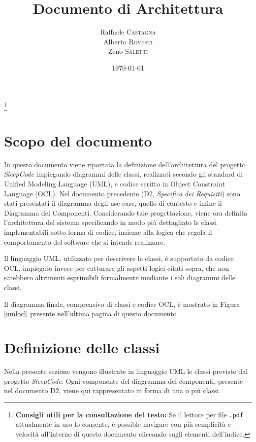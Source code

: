 \documentclass[11pt, a4paper]{article}
\title{Documento di Architettura}
\author{Raffaele \textsc{Castagna}\\
Alberto \textsc{Rovesti}\\
Zeno \textsc{Saletti}}
\date{\today}
\theoremstyle{definition} %
\newcommand\blfootnote[1]{%
  \begingroup
  \renewcommand\thefootnote{}\footnote{#1}%
  \addtocounter{footnote}{-1}%
  \endgroup
}
\begin{document}


\tableofcontents\blfootnote{\textbf{Consigli utili per la consultazione del testo:} Se il lettore per file \texttt{.pdf} attualmente in uso lo consente, è possible navigare con più semplicità e velocità all'interno di questo documento cliccando sugli elementi dell'indice.}

\newpage

\section*{Scopo del documento}
In questo documento viene riportata la definizione dell'architettura del
progetto \textit{SleepCode} impiegando diagrammi delle classi, realizzati
secondo gli standard di Unified Modeling Language (UML), e codice scritto in Object
Constraint Language (OCL). Nel documento precedente (D2, \textit{Specifica
dei Requisiti}) sono stati presentati il diagramma degli use case, quello
di contesto e infine il Diagramma dei Componenti. Considerando tale
progettazione, viene ora definita l'architettura del sistema specificando
in modo più dettagliato le classi implementabili sotto forma di
codice, insieme alla logica che regola il comportamento del software che
si intende realizzare.

Il linguaggio UML, utilizzato per descrivere le classi, è supportato da
codice OCL, impiegato invece per catturare gli aspetti logici citati sopra,
che non sarebbero altrimenti esprimibili formalmente mediante i soli diagrammi delle
classi.

Il diagramma finale, comprensivo di classi e codice OCL, è mostrato in
Figura \ref{umlocl} presente nell'ultima pagina di questo documento


\newpage
\section{Definizione delle classi}
Nella presente sezione vengono illustrate in linguaggio UML le classi
previste dal progetto \textit{SleepCode}. Ogni componente del diagramma
dei componenti, presente nel documento D2, viene qui rappresentato
in forma di una o più classi.

\end{document}
